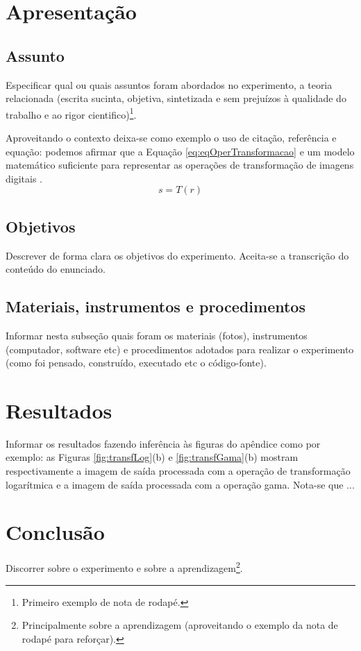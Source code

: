 \documentclass[11pt, a4paper]{article}
\begin{document}
\begin{twocolumn}
\section*{Apresentação}
\subsection*{Assunto}
Especificar qual ou quais assuntos foram abordados no experimento, a teoria relacionada (escrita sucinta, objetiva, sintetizada e sem prejuízos à qualidade do trabalho e ao rigor cientifico)\footnote{Primeiro exemplo de nota de rodapé.}.

Aproveitando o contexto deixa-se como exemplo o uso de citação,  referência e equação: podemos afirmar que a Equação \ref{eq:eqOperTransformacao} e um modelo matemático suficiente para representar as operações de transformação de imagens digitais \cite{GonzalezWoods}.
    \begin{equation}
        s=T(r)
        \label{eq:eqOperTransformacao}
    \end{equation}
\subsection*{Objetivos}
Descrever de forma clara os objetivos do experimento. Aceita-se a transcrição do conteúdo do enunciado.
\subsection*{Materiais, instrumentos e procedimentos}
Informar nesta subseção quais foram os materiais (fotos), instrumentos (computador, software etc) e procedimentos adotados para realizar o experimento (como foi pensado, construído, executado etc o código-fonte).
\section*{Resultados}
Informar os resultados fazendo inferência às figuras do apêndice como por exemplo: as Figuras \ref{fig:transfLog}(b) e \ref{fig:transfGama}(b) mostram respectivamente a imagem de saída processada com a operação de transformação logarítmica e a imagem de saída processada com a operação gama. Nota-se que ... 
\section*{Conclusão}
Discorrer sobre o experimento e sobre a aprendizagem\footnote{Principalmente sobre a aprendizagem (aproveitando o exemplo da nota de rodapé para reforçar).}.


\end{twocolumn}
\end{document}
